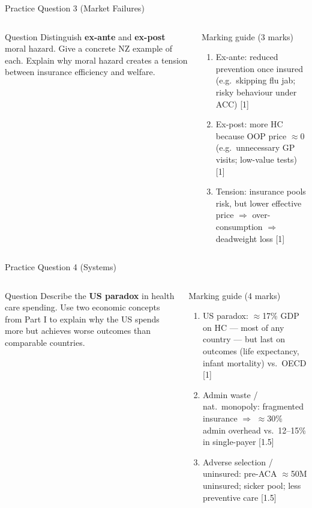 \documentclass[aspectratio=169, 12pt]{beamer}
\begin{document}
\begin{frame}{Practice Question 3 (Market Failures)}
  \begin{columns}
      \begin{block}{Question}
        \small Distinguish \textbf{ex-ante} and \textbf{ex-post} moral hazard. Give a concrete NZ example of each. Explain why moral hazard creates a tension between insurance efficiency and welfare.
      \end{block}
      \begin{alertblock}{Marking guide (3 marks)}
        \small
        \begin{enumerate}
          \item Ex-ante: reduced prevention once insured (e.g.\ skipping flu jab; risky behaviour under ACC) \hfill[1]
          \item Ex-post: more HC because OOP price $\approx 0$ (e.g.\ unnecessary GP visits; low-value tests) \hfill[1]
          \item Tension: insurance pools risk, but lower effective price $\Rightarrow$ over-consumption $\Rightarrow$ deadweight loss \hfill[1]
        \end{enumerate}
      \end{alertblock}
  \end{columns}
\end{frame}

\begin{frame}{Practice Question 4 (Systems)}
  \begin{columns}
      \begin{block}{Question}
        \small Describe the \textbf{US paradox} in health care spending. Use two economic concepts from Part I to explain why the US spends more but achieves worse outcomes than comparable countries.
      \end{block}
      \begin{alertblock}{Marking guide (4 marks)}
        \small
        \begin{enumerate}
          \item US paradox: $\approx$17\% GDP on HC --- most of any country --- but last on outcomes (life expectancy, infant mortality) vs.\ OECD \hfill[1]
          \item Admin waste / nat.\ monopoly: fragmented insurance $\Rightarrow$ $\approx$30\% admin overhead vs.\ 12--15\% in single-payer \hfill[1.5]
          \item Adverse selection / uninsured: pre-ACA $\approx$50M uninsured; sicker pool; less preventive care \hfill[1.5]
        \end{enumerate}
      \end{alertblock}
  \end{columns}
\end{frame}
\end{document}
